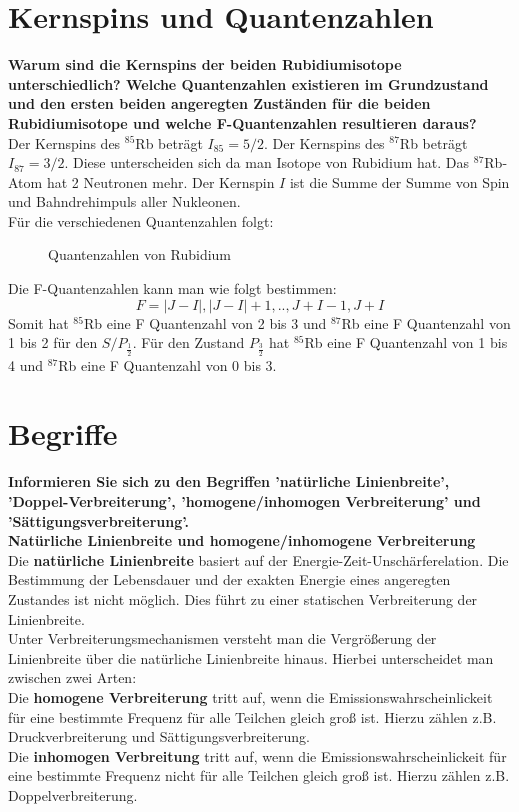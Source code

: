 \section{Kernspins und Quantenzahlen}
\textbf{Warum sind die Kernspins der beiden Rubidiumisotope unterschiedlich? Welche Quantenzahlen existieren im Grundzustand und den ersten beiden angeregten Zuständen für die beiden Rubidiumisotope und welche F-Quantenzahlen resultieren daraus?}\\

Der Kernspins des $^{85}$Rb beträgt $I_{85}=5/2$.
Der Kernspins des $^{87}$Rb beträgt $I_{87}=3/2$.
Diese unterscheiden sich da man Isotope von Rubidium hat.
Das $^{87}$Rb-Atom hat 2 Neutronen mehr.
Der Kernspin $I$ ist die Summe der Summe von Spin und Bahndrehimpuls aller Nukleonen.\\

Für die verschiedenen Quantenzahlen folgt:
\begin{figure}[h]
    \caption{Quantenzahlen von Rubidium}
\end{figure}

Die F-Quantenzahlen kann man wie folgt bestimmen:
\begin{equation}
    F=\left|J-I\right|,\left|J-I\right|+1,..,J+I-1,J+I
\end{equation}
Somit hat $^{85}$Rb eine F Quantenzahl von 2 bis 3 und $^{87}$Rb eine F Quantenzahl von 1 bis 2 für den $S/P_{\frac{1}{2}}$.
Für den Zustand $P_{\frac{3}{2}}$ hat $^{85}$Rb eine F Quantenzahl von 1 bis 4 und $^{87}$Rb eine F Quantenzahl von 0 bis 3.
\section{Begriffe}
\textbf{Informieren Sie sich zu den Begriffen 'natürliche Linienbreite', 'Doppel-Verbreiterung', 'homogene/inhomogen Verbreiterung' und 'Sättigungsverbreiterung'.}\\

\textbf{Natürliche Linienbreite und homogene/inhomogene Verbreiterung}\\
Die \textbf{natürliche Linienbreite} basiert auf der Energie-Zeit-Unschärferelation.
Die Bestimmung der Lebensdauer und der exakten Energie eines 
angeregten Zustandes ist nicht möglich. 
Dies führt zu einer statischen Verbreiterung der Linienbreite.\\
Unter Verbreiterungsmechanismen versteht man die Vergrößerung der Linienbreite
über die natürliche Linienbreite hinaus. Hierbei unterscheidet man zwischen zwei Arten:\\
Die \textbf{homogene Verbreiterung} tritt auf, wenn die Emissionswahrscheinlickeit für eine bestimmte Frequenz 
für alle Teilchen gleich groß ist. Hierzu zählen z.B. Druckverbreiterung und Sättigungsverbreiterung.\\
Die \textbf{inhomogen Verbreitung} tritt auf, wenn die Emissionswahrscheinlickeit für eine bestimmte Frequenz 
nicht für alle Teilchen gleich groß ist. Hierzu zählen z.B. Doppelverbreiterung.\\

